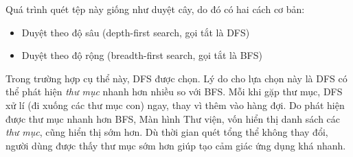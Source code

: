 \documentclass[../../../../thesis]{subfiles}
\begin{document}
Quá trình quét tệp này giống như duyệt cây, do đó có hai cách cơ bản:

\begin{itemize}
    \item
        Duyệt theo độ sâu (depth-first search, gọi tắt là DFS)
    \item
        Duyệt theo độ rộng (breadth-first search, gọi tắt là BFS)
\end{itemize}

Trong trường hợp cụ thể này, DFS được chọn. Lý do cho lựa chọn này là DFS có thể
phát hiện \emph{thư mục} nhanh hơn nhiều so với BFS. Mỗi khi gặp thư mục, DFS xử
lí (đi xuống các thư mục con) ngay, thay vì thêm vào hàng đợi. Do phát hiện được
thư mục nhanh hơn BFS, Màn hình Thư viện, vốn hiển thị danh sách các \emph{thư
mục}, cũng hiển thị sớm hơn. Dù thời gian quét tổng thể không thay đổi, người
dùng được thấy thư mục sớm hơn giúp tạo cảm giác ứng dụng khá nhanh.
\end{document}
